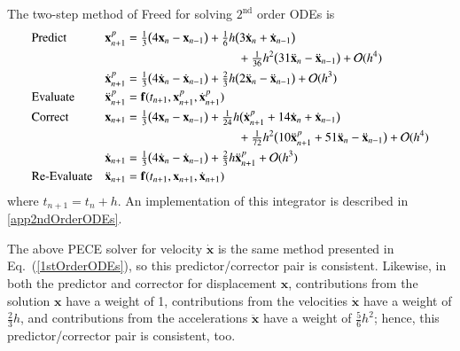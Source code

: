 The two-step method of Freed \cite{Freed17a} for solving $2^{\text{nd}}$ order ODEs is
\begin{subequations}
    \label{pairedMethods}
    \begin{align}
    \mbox{} & \text{Predict} &
    \mathbf{x}_{n+1}^p & = \tfrac{1}{3} \bigl(
    4 \mathbf{x}_n - \mathbf{x}_{n-1} \bigr) + 
    \tfrac{1}{6} h \bigl( 3 \dot{\mathbf{x}}_n + 
    \dot{\mathbf{x}}_{n-1} \bigr) \notag \\ 
    \mbox{} & & & \hspace{3.175cm} + 
    \tfrac{1}{36} h^2 \bigl( 31 \ddot{\mathbf{x}}_n - 
    \ddot{\mathbf{x}}_{n-1} \bigr) + \mathcal{O} (h^4) 
    \label{displacementPredictor} \\
    \mbox{} & &
    \dot{\mathbf{x}}_{n+1}^p & = \tfrac{1}{3} 
    \bigl( 4 \dot{\mathbf{x}}_n - \dot{\mathbf{x}}_{n-1} \bigr) + 
    \tfrac{2}{3} h \bigl( 2\ddot{\mathbf{x}}_n - \ddot{\mathbf{x}}_{n-1} 
    \bigr) + \mathcal{O} (h^3)
    \label{velocityPredictor} \\
    \mbox{} & \text{Evaluate} &
    \ddot{\mathbf{x}}^p_{n+1} & = \mathbf{f} (t_{n+1}, \mathbf{x}^p_{n+1}, \dot{\mathbf{x}}^p_{n+1}) 
    \label{2ndEvaluate} \\
    \mbox{} & \text{Correct} & 
    \mathbf{x}_{n+1} & = \tfrac{1}{3} \bigl(
    4  \mathbf{x}_n - \mathbf{x}_{n-1} \bigr) +
    \tfrac{1}{24} h \bigl( \dot{\mathbf{x}}^p_{n+1} +
    14 \dot{\mathbf{x}}_n + \dot{\mathbf{x}}_{n-1} \bigr) 
    \notag \\
    \mbox{} & & & \hspace{3.175cm} +
    \tfrac{1}{72} h^2 \bigl( 10 \ddot{\mathbf{x}}^p_{n+1} + 
    51 \ddot{\mathbf{x}}_n - \ddot{\mathbf{x}}_{n-1} \bigr) + 
    \mathcal{O} (h^4)
    \label{displacementCorrector} \\ 
    \mbox{} & &
    \dot{\mathbf{x}}_{n+1} & = \tfrac{1}{3} 
    \bigl( 4 \dot{\mathbf{x}}_n - \dot{\mathbf{x}}_{n-1} \bigr) + 
    \tfrac{2}{3} h \ddot{\mathbf{x}}^p_{n+1} + \mathcal{O} (h^3)
    \label{velocityCorrector} \\
    \mbox{} & \text{Re-Evaluate} & 
    \ddot{\mathbf{x}}_{n+1} & = \mathbf{f} (t_{n+1}, \mathbf{x}_{n+1}, \dot{\mathbf{x}}_{n+1})
    \label{2ndReEvaluate}
    \end{align}
\end{subequations}
where $t_{n+1} = t_n + h$.  An implementation of this integrator is described in \ref{app2ndOrderODEs}.  

The above PECE solver for velocity $\dot{\mathbf{x}}$ is the same method presented in Eq.~(\ref{1stOrderODEs}), so this predictor\slash corrector pair is consistent.  Likewise, in both the predictor and corrector for displacement $\mathbf{x}$, contributions from the solution $\mathbf{x}$ have a weight of 1, contributions from the velocities $\dot{\mathbf{x}}$ have a weight of $\tfrac{2}{3} h$, and contributions from the accelerations $\ddot{\mathbf{x}}$ have a weight of $\tfrac{5}{6} h^2$; hence, this predictor\slash corrector pair is consistent, too.

